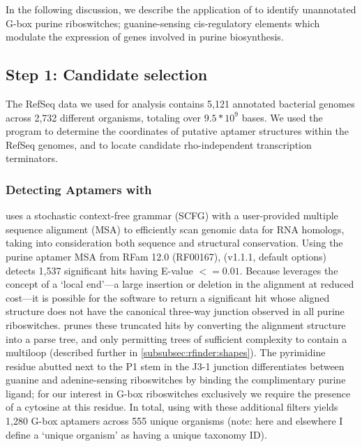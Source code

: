In the following discussion, we describe the application of \rfinder to identify unannotated G-box purine riboswitches; guanine-sensing cis-regulatory elements which modulate the expression of genes involved in purine biosynthesis.

\subsection{Step 1: Candidate selection}
\label{subsec:rfinder:selection}

The RefSeq data we used for analysis contains 5,121 annotated bacterial genomes across 2,732 different organisms, totaling over $9.5 * 10^9$ bases. We used the program \infernal to determine the coordinates of putative aptamer structures within the RefSeq genomes, and \tthp to locate candidate rho-independent transcription terminators.

\subsubsection{Detecting Aptamers with \infernal}
\label{subsubsec:rfinder:infernal}

\infernal uses a stochastic context-free grammar (SCFG) with a user-provided multiple sequence alignment (MSA) to efficiently scan genomic data for RNA homologs, taking into consideration both sequence and structural conservation. Using the purine aptamer MSA from RFam 12.0 (RF00167), \infernal (v1.1.1, default options) detects 1,537 significant hits having E-value $<= 0.01$. Because \infernal leverages the concept of a `local end'---a large insertion or deletion in the alignment at reduced cost---it is possible for the software to return a significant hit whose aligned structure does not have the canonical three-way junction observed in all purine riboswitches. \rfinder prunes these truncated \infernal hits by converting the alignment structure into a parse tree, and only permitting trees of sufficient complexity to contain a multiloop (described further in \ref{subsubsec:rfinder:shapes}). The pyrimidine residue abutted next to the P1 stem in the J3-1 junction differentiates between guanine and adenine-sensing riboswitches by binding the complimentary purine ligand; for our interest in G-box riboswitches exclusively we require the presence of a cytosine at this residue. In total, using \infernal with these additional filters yields 1,280 G-box aptamers across 555 unique organisms (note: here and elsewhere I define a `unique organism' as having a unique taxonomy ID).

